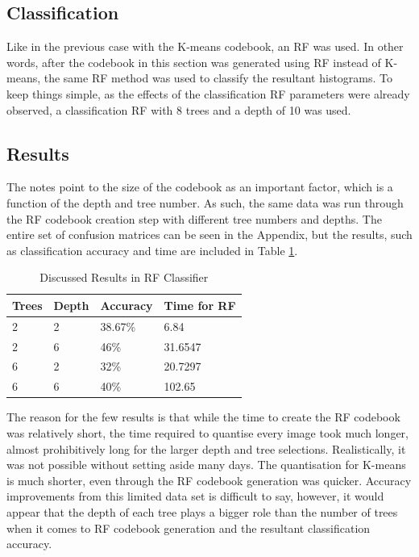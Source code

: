 \documentclass[a4paper, 10pt, conference]{ieeeconf}
\begin{document}
\subsection{Classification}
Like in the previous case with the K-means codebook, an RF was used. In other words, after the codebook in this section was generated using RF instead of K-means, the same RF method was used to classify the resultant histograms. To keep things simple, as the effects of the classification RF parameters were already observed, a classification RF with 8 trees and a depth of 10 was used.

\subsection{Results}
The notes point to the size of the codebook as an important factor, which is a function of the depth and tree number. As such, the same data was run through the RF codebook creation step with different tree numbers and depths. The entire set of confusion matrices can be seen in the Appendix, but the results, such as classification accuracy and time are included in Table \ref{tbl:rfrf}.

\begin{table}[!ht]
  \centering
  \caption{Discussed Results in RF Classifier}
  \label{tbl:rfrf}
  \begin{tabular}{|llll|}
  	\hline
    Trees & Depth & Accuracy & Time for RF \\ \hline
    2 & 2 & 38.67\% & 6.84\\
    2 & 6 & 46\% & 31.6547\\
    6 & 2 & 32\% & 20.7297\\
    6 & 6 & 40\% & 102.65\\
  \hline
\end{tabular}

The reason for the few results is that while the time to create the RF codebook was relatively short, the time required to quantise every image took much longer, almost prohibitively long for the larger depth and tree selections. Realistically, it was not possible without setting aside many days. The quantisation for K-means is much shorter, even through the RF codebook generation was quicker. Accuracy improvements from this limited data set is difficult to say, however, it would appear that the depth of each tree plays a bigger role than the number of trees when it comes to RF codebook generation and the resultant classification accuracy. 

\end{table}
\end{document}
